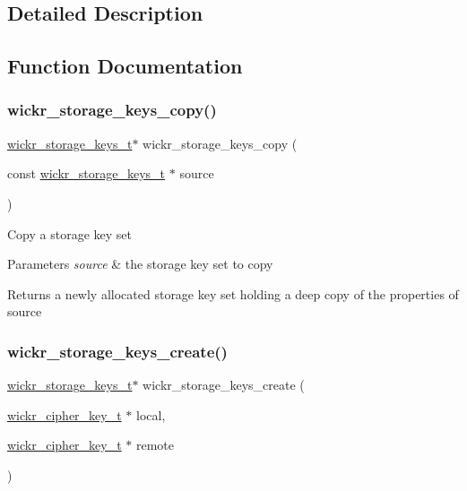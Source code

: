 \subsection{Detailed Description}


\subsection{Function Documentation}
\mbox{\label{group__wickr__storage__keys_gad6839a21bca1c28775d51deb6b7c3835}} 
\subsubsection{\texorpdfstring{wickr\_storage\_keys\_copy()}{wickr\_storage\_keys\_copy()}}
{\footnotesize\ttfamily \mbox{\hyperlink{structwickr__storage__keys}{wickr\+\_\+storage\+\_\+keys\+\_\+t}}$\ast$ wickr\+\_\+storage\+\_\+keys\+\_\+copy (\begin{DoxyParamCaption}\item[{const \mbox{\hyperlink{structwickr__storage__keys}{wickr\+\_\+storage\+\_\+keys\+\_\+t}} $\ast$}]{source }\end{DoxyParamCaption})}

Copy a storage key set


\begin{DoxyParams}{Parameters}
{\em source} & the storage key set to copy \\
\hline
\end{DoxyParams}
\begin{DoxyReturn}{Returns}
a newly allocated storage key set holding a deep copy of the properties of \textquotesingle{}source\textquotesingle{} 
\end{DoxyReturn}
\mbox{\label{group__wickr__storage__keys_gad03ddd5ea10633ca35097e5f4707d5cb}} 
\subsubsection{\texorpdfstring{wickr\_storage\_keys\_create()}{wickr\_storage\_keys\_create()}}
{\footnotesize\ttfamily \mbox{\hyperlink{structwickr__storage__keys}{wickr\+\_\+storage\+\_\+keys\+\_\+t}}$\ast$ wickr\+\_\+storage\+\_\+keys\+\_\+create (\begin{DoxyParamCaption}\item[{\mbox{\hyperlink{structwickr__cipher__key}{wickr\+\_\+cipher\+\_\+key\+\_\+t}} $\ast$}]{local,  }\item[{\mbox{\hyperlink{structwickr__cipher__key}{wickr\+\_\+cipher\+\_\+key\+\_\+t}} $\ast$}]{remote }\end{DoxyParamCaption})}

